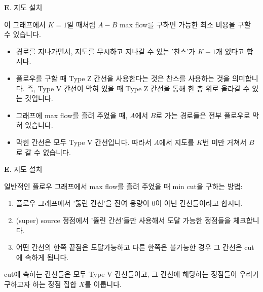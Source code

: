 \begin{frame}{\textbf{E}. 지도 설치}

    이 그래프에서 $K=1$일 때처럼 $A - B$ max flow를 구하면 가능한 최소 비용을 구할 수 있습니다.
    
    \begin{itemize}
        \item 경로를 지나가면서, 지도를 무시하고 지나갈 수 있는 '찬스'가 $K-1$개 있다고 합시다.
        \item 플로우를 구할 때 Type Z 간선을 사용한다는 것은 찬스를 사용하는 것을 의미합니다. \newline
              즉, Type V 간선이 막혀 있을 때 Type Z 간선을 통해 한 층 위로 올라갈 수 있는 것입니다.
        \item 그래프에 max flow를 흘려 주었을 때, $A$에서 $B$로 가는 경로들은 전부 플로우로 막혀 있습니다.
        \item 막힌 간선은 모두 Type V 간선입니다. 따라서 $A$에서 지도를 $K$번 미만 거쳐서 $B$로 갈 수 없습니다.
    \end{itemize}
    
    
\end{frame}


\begin{frame}{\textbf{E}. 지도 설치}

    일반적인 플로우 그래프에서 max flow를 흘려 주었을 때 min cut을 구하는 방법:
    \begin{enumerate}
        \item 플로우 그래프에서 '뚫린 간선'을 잔여 용량이 0이 아닌 간선들이라고 합시다.
        \item (super) source 정점에서 '뚫린 간선'들만 사용해서 도달 가능한 정점들을 체크합니다.
        \item 어떤 간선의 한쪽 끝점은 도달가능하고 다른 한쪽은 불가능한 경우 그 간선은 cut에 속하게 됩니다.
    \end{enumerate}
    
    \vspace{0.5 \baselineskip}
    
    cut에 속하는 간선들은 모두 Type V 간선들이고, 그 간선에 해당하는 정점들이 우리가 구하고자 하는 정점 집합 $X$를 이룹니다.
    
\end{frame}


